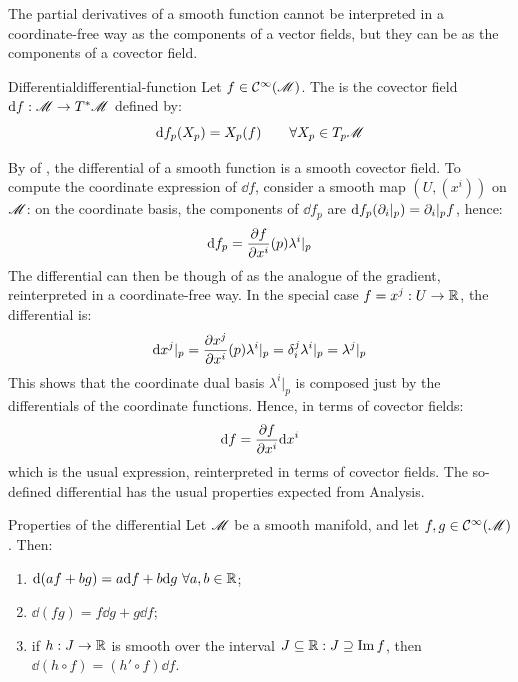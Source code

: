 The partial derivatives of a smooth function cannot be interpreted in a coordinate-free way as the components of a vector fields, but they can be as the components of a covector field.

\begin{definition}{Differential}{differential-function}
  Let $ f \in \mathcal{C}^{\infty}(\mathscr{M}) $. The  is the covector field $ \mathrm{d} f : \mathscr{M} \rightarrow T^*\mathscr{M} $ defined by:
  \begin{equation}
    \mathrm{d} f_p(X_p) = X_p(f)
    \qquad
    \forall X_p \in T_p\mathscr{M}
  \end{equation}
\end{definition}

By  of , the differential of a smooth function is a smooth covector field. To compute the coordinate expression of $ \dd f $, consider a smooth map $ (U,(x^i)) $ on $ \mathscr{M} $: on the coordinate basis, the components of $ \dd f_p $ are $ \mathrm{d} f_p (\partial_i \vert_p) = \partial_i \vert_p f $, hence:
\begin{equation}
  \mathrm{d} f_p = \frac{\partial f}{\partial x^i} (p) \lambda^i \vert_p
\end{equation}
The differential can then be though of as the analogue of the gradient, reinterpreted in a coordinate-free way. In the special case $ f = x^j : U \rightarrow \mathbb{R} $, the differential is:
\begin{equation*}
  \mathrm{d} x^j \vert_p = \frac{\partial x^j}{\partial x^i} (p) \lambda^i \vert_p = \delta^j_i \lambda^i \vert_p = \lambda^j \vert_p
\end{equation*}
This shows that the coordinate dual basis $ \lambda^i \vert_p $ is composed just by the differentials of the coordinate functions. Hence, in terms of covector fields:
\begin{equation}
  \mathrm{d} f = \frac{\partial f}{\partial x^i} \mathrm{d} x^i
  \label{eq:func-diff}
\end{equation}
which is the usual expression, reinterpreted in terms of covector fields. The so-defined differential has the usual properties expected from Analysis.

\begin{lemma}{Properties of the differential}{}
  Let $ \mathscr{M} $ be a smooth manifold, and let $ f,g \in \mathcal{C}^{\infty}(\mathscr{M}) $. Then:
  \begin{enumerate}
    \item $ \mathrm{d} (a f + b g) = a \mathrm{d} f + b \mathrm{d} g \,\,\forall a,b \in \mathbb{R} $;
    \item $ \dd (fg) = f \dd g + g \dd f $;
    \item if $ h : J \rightarrow \mathbb{R} $ is smooth over the interval $ J \subseteq \mathbb{R} : J \supseteq \operatorname{Im} f $, then $ \dd (h \circ f) = (h' \circ f) \dd f $.
  \end{enumerate}
\end{lemma}

